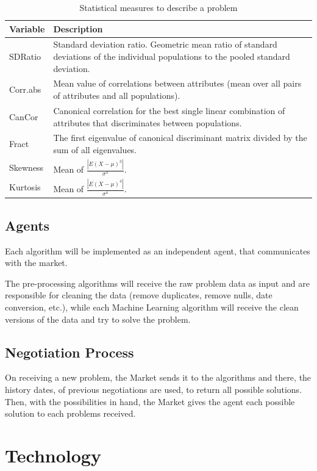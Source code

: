 \documentclass{llncs}
\begin{document}
\begin{table}[h]
\centering
\begin{tabular}{l p{10cm}}
\textbf{Variable} & \textbf{Description} \\
\hline
SDRatio & Standard deviation ratio. Geometric mean ratio of standard deviations of the individual populations to the pooled standard deviation. \\ 
Corr.abs & Mean value of correlations between attributes (mean over all pairs of attributes and all populations). \\
CanCor & Canonical correlation for the best single linear combination of attributes that discriminates between populations. \\
Fract & The first eigenvalue of canonical discriminant matrix divided by the sum of all eigenvalues. \\
Skewness &  Mean of $ \frac{| E(X-\mu)^3 |}{\sigma^3}$.\\
Kurtosis &  Mean of $\frac{| E(X-\mu)^4 |} {\sigma^4}$.\\
\hline
\end{tabular}
\caption{Statistical measures to describe a problem}
\label{tab:stat}
\end{table}

\subsection{Agents}

Each algorithm will be implemented as an independent agent, that communicates with the market. 

The pre-processing algorithms will receive the raw problem data as input and are responsible for cleaning the data (remove duplicates, remove nulls, date conversion, etc.), while each Machine Learning algorithm will receive the clean versions of the data and try to solve the problem. 


\subsection{Negotiation Process}

On receiving a new problem, the Market sends it to the algorithms and there, the history dates, of previous negotiations are used, to return all possible solutions.
Then, with the possibilities in hand, the Market gives the agent each possible solution to each problems received.


\section{Technology}
\end{document}
